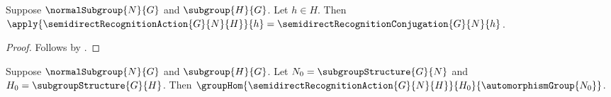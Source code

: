 \begin{proposition}\label{semidirect_recognition_action_apply}
    Suppose $\normalSubgroup{N}{G}$ and $\subgroup{H}{G}$.
    Let $h\in H$.
    Then
        $\apply{\semidirectRecognitionAction{G}{N}{H}}{h}=
            \semidirectRecognitionConjugation{G}{N}{h}$.
\end{proposition}
\begin{proof}
    Follows by
        .
\end{proof}

\begin{theorem}\label{semidirect_recognition_action_hom}
    Suppose $\normalSubgroup{N}{G}$ and $\subgroup{H}{G}$.
    Let $N_0=\subgroupStructure{G}{N}$ and
        $H_0=\subgroupStructure{G}{H}$.
    Then
        $\groupHom{\semidirectRecognitionAction{G}{N}{H}}
            {H_0}{\automorphismGroup{N_0}}$.
\end{theorem}
